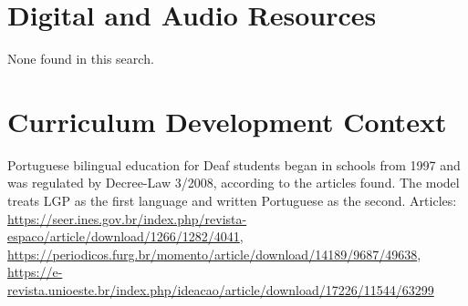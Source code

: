 \documentclass[12pt]{article}
\begin{document}
\section{Digital and Audio Resources}
None found in this search.

\section{Curriculum Development Context}
Portuguese bilingual education for Deaf students began in schools from 1997 and was regulated by Decree-Law 3/2008, according to the articles found. The model treats LGP as the first language and written Portuguese as the second. Articles: \url{https://seer.ines.gov.br/index.php/revista-espaco/article/download/1266/1282/4041}, \url{https://periodicos.furg.br/momento/article/download/14189/9687/49638}, \url{https://e-revista.unioeste.br/index.php/ideacao/article/download/17226/11544/63299}
\end{document}
